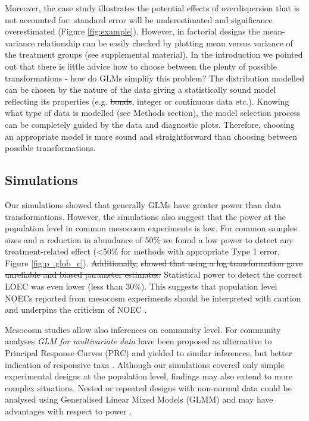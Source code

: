 \documentclass[twocolumn, natbib]{svjour3}
\providecommand{\DIFadd}[1]{{\protect\color{blue}\uwave{#1}}} %
\providecommand{\DIFdel}[1]{{\protect\color{red}\sout{#1}}}                      %
\providecommand{\DIFaddbegin}{} %
\providecommand{\DIFaddend}{} %
\providecommand{\DIFdelbegin}{} %
\providecommand{\DIFdelend}{} %
\begin{document}
Moreover, the case study illustrates the potential effects of overdispersion that is not accounted for: standard error will be underestimated and significance overestimated (Figure \ref{fig:example}).
However, in factorial designs the mean-variance relationship can be easily checked by plotting mean versus variance of the treatment groups (see supplemental material).
In the introduction we pointed out that there is little advice how to choose between the plenty of possible transformations - how do GLMs simplify this problem?
The distribution modelled can be chosen by the nature of the data giving a statistically sound model reflecting its properties (e.g. \DIFdelbegin \DIFdel{bonds}\DIFdelend \DIFaddbegin \DIFadd{bounds}\DIFaddend , integer or continuous data etc.).
Knowing what type of data is modelled (see Methods section), the model selection process can be completely guided by the data and diagnostic plots. Therefore, choosing an appropriate model is more sound and straightforward than choosing between possible transformations.


\subsection{Simulations}
Our simulations showed that generally GLMs have greater power than data transformations.
However, the simulations also suggest that the power at the population level in common mesocosm experiments is low.
For common samples sizes and a reduction in abundance of 50\% we found a low power to detect any treatment-related effect (\textless 50\% for methods with appropriate Type 1 error, Figure \ref{fig:p_glob_c}).
\DIFdelbegin \DIFdel{Additionally, }%
\DIFdel{showed that using a log transformation gave unreliable and biased parameter estimates.
}\DIFdelend Statistical power to detect the correct LOEC was even lower (less than 30\%).
This suggests that population level NOECs reported from mesocosm experiments should be interpreted with caution and underpins the criticism of NOEC \citep{laskowski_good_1995,landis_well_2011}.

Mesocosm studies allow also inferences on community level. 
For community analyses \emph{GLM for multivariate data} \DIFaddbegin \citep{warton_distance-based_2012} \DIFaddend have been proposed as alternative to Principal Response Curves (PRC) and yielded to similar inferences, but better indication of responsive taxa \DIFdelbegin %
\DIFdelend \DIFaddbegin \citep{szocs_analysing_2015}\DIFaddend . 
Although our simulations covered only simple experimental designs at the population level, findings may also extend to more complex situations. 
Nested or repeated designs with non-normal data could be analysed using Generalised Linear Mixed Models (GLMM) and may have advantages with respect to power \citep{stroup_rethinking_2014}.
\end{document}
